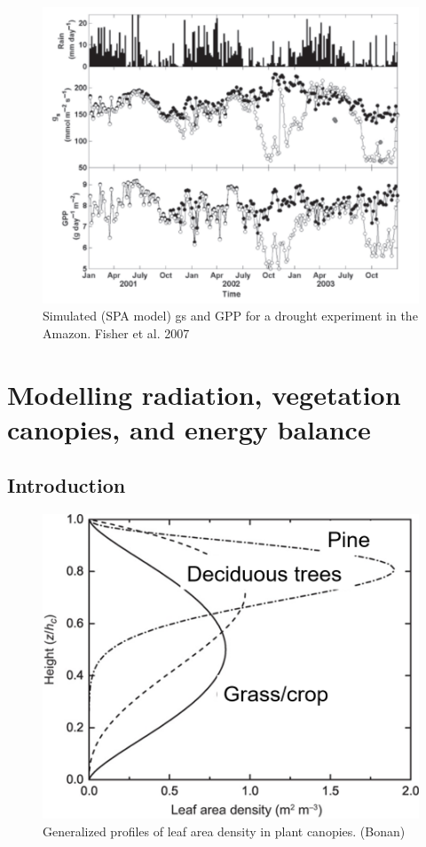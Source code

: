 \documentclass[12pt,oneside]{book}
\begin{document}
\begin{figure}

{\centering \includegraphics[width=0.8\linewidth]{figures/chap2/fisher2} 

}

\caption{Simulated (SPA model) gs and GPP for a drought experiment in the Amazon. Fisher et al. 2007}\label{fig:f225}
\end{figure}

\chapter{Modelling radiation, vegetation canopies, and energy
balance}\label{modelling-radiation-vegetation-canopies-and-energy-balance}


\section{Introduction}\label{introduction}

\begin{figure}

{\centering \includegraphics[width=0.8\linewidth]{figures/chap3/f31_LAD} 

}

\caption{Generalized profiles of leaf area density in plant canopies. (Bonan)}\label{fig:f31}
\end{figure}
\end{document}
